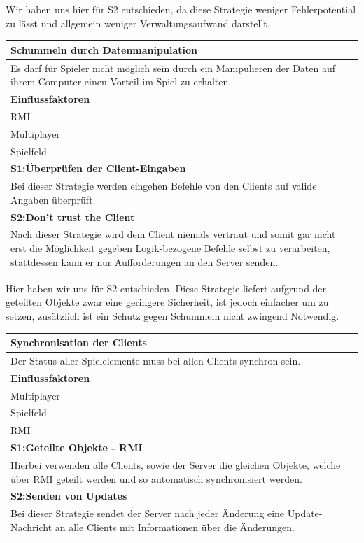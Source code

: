 \documentclass[fontsize=12pt,paper=a4,twoside]{scrartcl}
\begin{document}
Wir haben uns hier für S2 entschieden, da diese Strategie weniger Fehlerpotential zu lässt und allgemein weniger Verwaltungsaufwand darstellt.

\begin{tabular}{|p{15cm}|}
	\hline
	\bfseries{Schummeln durch Datenmanipulation}\\ \hline
	Es darf für Spieler nicht möglich sein durch ein Manipulieren der Daten auf ihrem Computer einen Vorteil im Spiel zu erhalten.\\ 
	\textbf{Einflussfaktoren}\\
	RMI\\ 
	Multiplayer\\ 
	Spielfeld\\ \hline
	\textbf{S1:Überprüfen der Client-Eingaben}\\
	Bei dieser Strategie werden eingehen Befehle von den Clients auf valide Angaben überprüft.\\ \hline
	\textbf{S2:Don't trust the Client}\\
	Nach dieser Strategie wird dem Client niemals vertraut und somit gar nicht erst die Möglichkeit gegeben Logik-bezogene Befehle selbst zu verarbeiten, stattdessen kann er nur Aufforderungen an den Server senden.\\ \hline
\end{tabular} 

Hier haben wir uns für S2 entschieden. Diese Strategie liefert aufgrund der geteilten Objekte zwar eine geringere Sicherheit, ist jedoch einfacher um zu setzen, zusätzlich ist ein Schutz gegen Schummeln nicht zwingend Notwendig.

\begin{tabular}{|p{15cm}|}
	\hline
	\bfseries{Synchronisation der Clients}\\ \hline
	Der Status aller Spielelemente muss bei allen Clients synchron sein.\\ 
	\textbf{Einflussfaktoren}\\
	Multiplayer\\ 
	Spielfeld\\ 
	RMI\\ \hline
	\textbf{S1:Geteilte Objekte - RMI}\\
	Hierbei verwenden alle Clients, sowie der Server die gleichen Objekte, welche über RMI geteilt werden und so automatisch synchronisiert werden.\\ \hline
	\textbf{S2:Senden von Updates}\\
	Bei dieser Strategie sendet der Server nach jeder Änderung eine Update-Nachricht an alle Clients mit Informationen über die Änderungen.\\ \hline
\end{tabular} 
\end{document}
